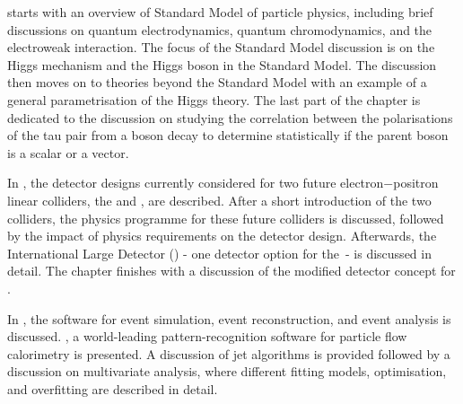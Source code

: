 
 starts with an overview of Standard Model of particle physics, including brief discussions on quantum electrodynamics, quantum chromodynamics, and the electroweak interaction. The focus of the Standard Model discussion is on the  Higgs mechanism and the Higgs boson in the Standard Model. The discussion then moves on to theories beyond the Standard Model with an example of   a general parametrisation of the Higgs theory. The last part of the chapter is dedicated to the discussion on studying the correlation between the polarisations of the  tau pair from a boson decay to determine statistically if the parent boson is a  scalar or a vector.



In , the detector designs currently considered for two future electron$-$positron linear colliders, the \ILC and \CLIC, are described. After a short introduction of the two colliders, the physics programme for these future colliders is discussed, followed by the impact of physics requirements on the detector design. Afterwards, the International Large Detector (\ILD) - one detector option for the \ILC\,- is discussed in detail. The chapter finishes with a discussion of the modified \ILD detector concept for \CLIC.

In , the software for event simulation, event reconstruction, and event analysis is  discussed.  \pandora, a world-leading pattern-recognition software for particle flow calorimetry is presented. A discussion of jet algorithms is provided followed by a discussion on  multivariate analysis, where different fitting models, optimisation, and overfitting are described in detail.




